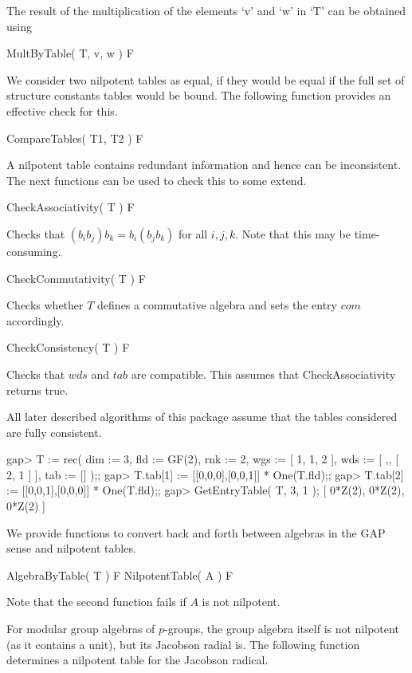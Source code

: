 The result of the multiplication of the elements `v' and `w' in `T'
can be obtained using

\> MultByTable( T, v, w ) F

We consider two nilpotent tables as equal, if they would be equal if
the full set of structure constants tables would be bound. The following
function provides an effective check for this.

\> CompareTables( T1, T2 ) F

A nilpotent table contains redundant information and hence can be 
inconsistent. The next functions can be used to check this to some
extend. 

\> CheckAssociativity( T ) F

Checks that $(b_i b_j) b_k = b_i (b_j b_k)$ for all $i,j,k$. Note that this
may be time-consuming.

\> CheckCommutativity( T ) F

Checks whether $T$ defines a commutative algebra and sets the entry $com$
accordingly.

\> CheckConsistency( T ) F

Checks that $wds$ and $tab$ are compatible. This assumes that 
CheckAssociativity returns true.

All later described algorithms of this package assume that the tables 
considered are fully consistent.

\beginexample
gap> T := rec( dim := 3, 
               fld := GF(2), 
               rnk := 2, 
               wgs := [ 1, 1, 2 ],
               wds := [ ,, [ 2, 1 ] ],
               tab := [] );;
gap> T.tab[1] := [[0,0,0],[0,0,1]] * One(T.fld);;
gap> T.tab[2] := [[0,0,1],[0,0,0]] * One(T.fld);;
gap> GetEntryTable( T, 3, 1 );
[ 0*Z(2), 0*Z(2), 0*Z(2) ]
\endexample


We provide functions to convert back and forth between algebras in the GAP
sense and nilpotent tables.

\> AlgebraByTable( T ) F
\> NilpotentTable( A ) F

Note that the second function fails if $A$ is not nilpotent.

For modular group algebras of $p$-groups, the group algebra itself is
not nilpotent (as it contains a unit), but its Jacobson radial is. The
following function determines a nilpotent table for the Jacobson radical.

